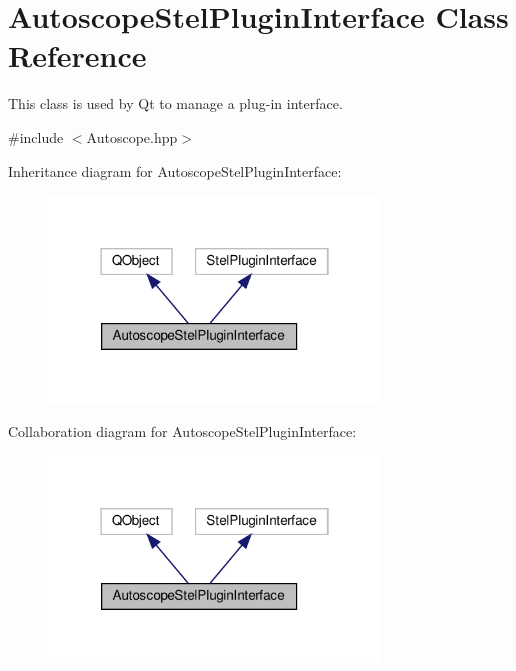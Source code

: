 \hypertarget{class_autoscope_stel_plugin_interface}{}\section{Autoscope\+Stel\+Plugin\+Interface Class Reference}
\label{class_autoscope_stel_plugin_interface}


This class is used by Qt to manage a plug-\/in interface.  




{\ttfamily \#include $<$Autoscope.\+hpp$>$}



Inheritance diagram for Autoscope\+Stel\+Plugin\+Interface\+:\nopagebreak
\begin{figure}[H]
\begin{center}
\leavevmode
\includegraphics[width=250pt]{class_autoscope_stel_plugin_interface__inherit__graph}
\end{center}
\end{figure}


Collaboration diagram for Autoscope\+Stel\+Plugin\+Interface\+:\nopagebreak
\begin{figure}[H]
\begin{center}
\leavevmode
\includegraphics[width=250pt]{class_autoscope_stel_plugin_interface__coll__graph}
\end{center}
\end{figure}
